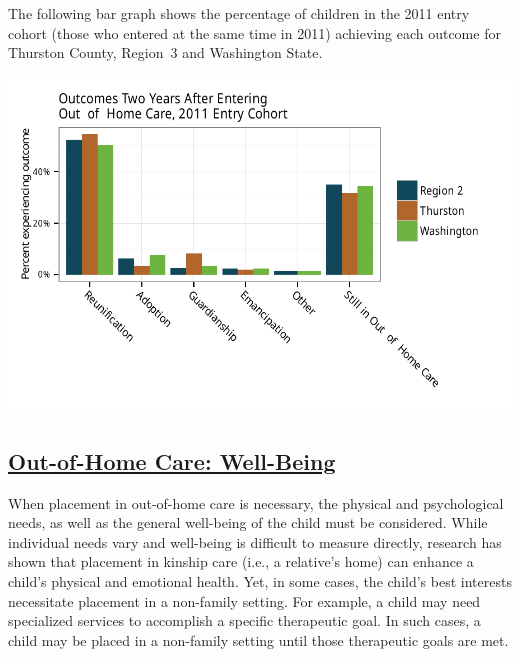 \documentclass{article}\usepackage[]{graphicx}\usepackage[]{color}
\makeatletter
\def\maxwidth{ %
  \ifdim\Gin@nat@width>\linewidth
    \linewidth
  \else
    \Gin@nat@width
  \fi
}
\newenvironment{knitrout}{}{} %
\makeatother
\begin{document}
The following bar graph shows the percentage of children in the 2011 entry cohort (those who entered at the same time in 2011) achieving each outcome for Thurston County, Region~3 and Washington State.
\nopagebreak[3]
\begin{knitrout}
\color{fgcolor}

{\centering \includegraphics[width=\maxwidth]{figure/ooh_outcomes-1} 

}



\end{knitrout}

\newpage

\subsection{\href{http://www.partnersforourchildren.org/data-portal/visualizations/out-home-care/well-being}
    {Out-of-Home Care: Well-Being}
}

When placement in out-of-home care is necessary, the physical and psychological needs, as well as the general well-being of the child must be considered. While individual needs vary and well-being is difficult to measure directly, research has shown that placement in kinship care (i.e., a relative's home) can enhance a child's physical and emotional health. Yet, in some cases, the child's best interests necessitate placement in a non-family setting. For example, a child may need specialized services to accomplish a specific therapeutic goal. In such cases, a child may be placed in a non-family setting until those therapeutic goals are met.
\end{document}
